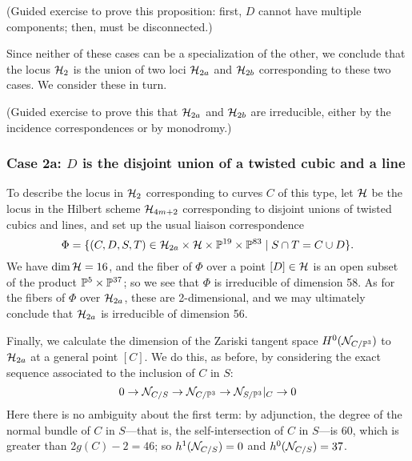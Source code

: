 \begin{exercise}
(Guided exercise to prove this proposition: first, $D$ cannot have multiple components; then, must be disconnected.)
\end{exercise}

Since neither of these cases can be a specialization of the other, we conclude that the locus $\cH_2$ is the union of two loci $\cH_{2a}$ and $\cH_{2b}$ corresponding to these two cases. We consider these in turn.


\begin{exercise}
(Guided exercise to prove this that $\cH_{2a}$ and $\cH_{2b}$ are irreducible, either by the incidence correspondences or by monodromy.)
\end{exercise}


\subsubsection{Case 2a: $D$ is the disjoint union of a twisted cubic and a line}

To describe the locus in $\cH_2$ corresponding to curves $C$ of this type, let $\cH$ be the locus in the Hilbert scheme $\cH_{4m+2}$ corresponding to disjoint unions of twisted cubics and lines, and set up the usual liaison correspondence
$$
\Phi = \{(C,D,S,T) \in \cH_{2a} \times \cH \times \PP^{19} \times \PP^{83} \mid S \cap T = C \cup D \}.
$$
We have $\dim \cH = 16$, and the fiber of $\Phi$ over a point $[D] \in \cH$ is an open subset of the product $\PP^5 \times \PP^{37}$; so we see that $\Phi$ is irreducible of dimension 58. As for the fibers of $\Phi$ over $ \cH_{2a}$, these are 2-dimensional, and we may ultimately conclude that $\cH_{2a}$ is irreducible of dimension 56.

Finally, we calculate the dimension of the Zariski tangent space $H^0(\cN_{C/\PP^3})$ to $\cH_{2a}$ at a general point $[C]$. We do this, as before, by considering the exact sequence associated to the inclusion of $C$ in $S$:
$$
0 \to \cN_{C/S} \to \cN_{C/\PP^3} \to \cN_{S/\PP^3}|_C \to 0
$$ 
Here there is no ambiguity about the first term: by adjunction, the degree of the normal bundle of $C$ in $S$---that is, the self-intersection of $C$ in $S$---is 60, which is greater than $2g(C) - 2 = 46$; so $h^1(\cN_{C/S}) = 0$ and $h^0(\cN_{C/S}) = 37$.

